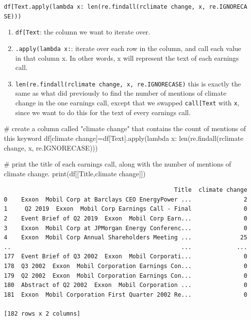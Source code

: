 \documentclass[
  letterpaper,
  DIV=11,
  numbers=noendperiod]{scrreprt}
\newenvironment{Shaded}{\begin{snugshade}}{\end{snugshade}}
\newcommand{\BuiltInTok}[1]{\textcolor[rgb]{0.00,0.23,0.31}{#1}}
\newcommand{\CommentTok}[1]{\textcolor[rgb]{0.37,0.37,0.37}{#1}}
\newcommand{\KeywordTok}[1]{\textcolor[rgb]{0.00,0.23,0.31}{#1}}
\newcommand{\NormalTok}[1]{\textcolor[rgb]{0.00,0.23,0.31}{#1}}
\newcommand{\OperatorTok}[1]{\textcolor[rgb]{0.37,0.37,0.37}{#1}}
\newcommand{\StringTok}[1]{\textcolor[rgb]{0.13,0.47,0.30}{#1}}
\newcommand{\VerbatimStringTok}[1]{\textcolor[rgb]{0.13,0.47,0.30}{#1}}
\providecommand{\tightlist}{%
  \setlength{\itemsep}{0pt}\setlength{\parskip}{0pt}}\usepackage{longtable,booktabs,array}
\begin{document}
\texttt{df{[}\textquotesingle{}Text\textquotesingle{}{]}.apply(lambda\ x:\ len(re.findall(r\textquotesingle{}climate\ change\textquotesingle{},\ x,\ re.IGNORECASE)))}

\begin{enumerate}
\def\labelenumi{\arabic{enumi}.}
\tightlist
\item
  \texttt{df{[}\textquotesingle{}Text\textquotesingle{}{]}}: the column
  we want to iterate over.
\item
  \texttt{.apply(lambda\ x:}: iterate over each row in the column, and
  call each value in that column x. In other words, x will represent the
  text of each earnings call.
\item
  \texttt{len(re.findall(r\textquotesingle{}climate\ change\textquotesingle{},\ x,\ re.IGNORECASE)}
  this is exactly the same as what did previously to find the number of
  mentions of climate change in the one earnings call, except that we
  swapped \texttt{call{[}\textquotesingle{}Text\textquotesingle{}{]}}
  with \texttt{x}, since we want to do this for the text of every
  earnings call.
\end{enumerate}

\begin{Shaded}
\begin{Highlighting}[]
\CommentTok{\# create a column called "climate change" that contains the count of mentions of this keyword}
\NormalTok{df[}\StringTok{\textquotesingle{}climate change\textquotesingle{}}\NormalTok{]}\OperatorTok{=}\NormalTok{df[}\StringTok{\textquotesingle{}Text\textquotesingle{}}\NormalTok{].}\BuiltInTok{apply}\NormalTok{(}\KeywordTok{lambda}\NormalTok{ x: }\BuiltInTok{len}\NormalTok{(re.findall(}\VerbatimStringTok{r\textquotesingle{}climate change\textquotesingle{}}\NormalTok{, x, re.IGNORECASE)))}

\CommentTok{\# print the title of each earnings call, along with the number of mentions of climate change.}
\BuiltInTok{print}\NormalTok{(df[[}\StringTok{\textquotesingle{}Title\textquotesingle{}}\NormalTok{,}\StringTok{\textquotesingle{}climate change\textquotesingle{}}\NormalTok{]])}
\end{Highlighting}
\end{Shaded}

\begin{verbatim}
                                                 Title  climate change
0    Exxon  Mobil Corp at Barclays CEO EnergyPower ...               2
1     Q2 2019  Exxon  Mobil Corp Earnings Call - Final               0
2    Event Brief of Q2 2019  Exxon  Mobil Corp Earn...               0
3    Exxon  Mobil Corp at JPMorgan Energy Conferenc...               0
4    Exxon  Mobil Corp Annual Shareholders Meeting ...              25
..                                                 ...             ...
177  Event Brief of Q3 2002  Exxon  Mobil Corporati...               0
178  Q3 2002  Exxon  Mobil Corporation Earnings Con...               0
179  Q2 2002  Exxon  Mobil Corporation Earnings Con...               0
180  Abstract of Q2 2002  Exxon  Mobil Corporation ...               0
181  Exxon  Mobil Corporation First Quarter 2002 Re...               0

[182 rows x 2 columns]
\end{verbatim}
\end{document}
